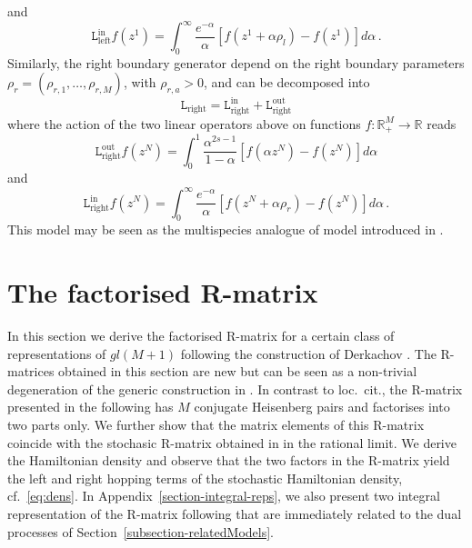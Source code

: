 \documentclass[11pt]{article}
\numberwithin{equation}{section}
\newcommand{\M}{M}
\newcommand{\N}{N}
\newcommand{\ecdL}{\mathtt{L}}
\newcommand{\heat}{z}
\begin{document}
and
\begin{equation}
	\ecdL_{\text{left}}^{\text{in}}f(\heat^{1})=\int_{0}^{\infty}\frac{e^{-\alpha}}{\alpha}\left[f(\heat^{1}+\alpha \rho_{l})- f(\heat^{1})\right]d \alpha\,.
\end{equation}
Similarly, the right boundary generator depend on the right boundary parameters $\rho_{r}=(\rho_{r,1},\ldots,\rho_{r,\M})$, with $\rho_{r,a}>0$, and can be decomposed into
\begin{equation}
	\ecdL_{\text{right}}=\ecdL_{\text{right}}^{\text{in}}+\ecdL_{\text{right}}^{\text{out}}
\end{equation}
where the action of the two linear operators above  on functions $f:\mathbb{R}_{+}^{\M}\to \mathbb{R}$ reads
\begin{equation}
	\ecdL_{\text{right}}^{\text{out}}f(\heat^{\N})=\int_0^1 \frac{\alpha^{2s-1}}{1-\alpha}\left[f(\alpha \heat^{\N})-f(\heat^{\N}) \right]d\alpha
\end{equation}
and
\begin{equation}
	\ecdL_{\text{right}}^{\text{in}}f(\heat^{\N})=\int_{0}^\infty\frac{e^{-\alpha}}{\alpha}\left[f(\heat^{\N}+\alpha \rho_{r})- f(\heat^{\N})\right]d \alpha\,.
\end{equation}
This model may be seen as the multispecies analogue of  model introduced in \cite{Frassek:2019vjt,Franceschini:2022vmr}.





\section{The factorised R-matrix}\label{sec:facR}
In this section we derive the factorised R-matrix for a certain class of representations of ${gl(\M+1)}$ following the construction of Derkachov \cite{Derkachov:2005hw}. The R-matrices obtained in this section are new but can be seen as a non-trivial degeneration of the generic construction in \cite{Derkachov:2008aq}. In contrast to loc.~cit., the R-matrix presented in the following has $M$ conjugate Heisenberg pairs and factorises into two parts only. We further show that the matrix elements of this R-matrix coincide with the stochasic R-matrix obtained in \cite{Kuniba:2016fpi,Bosnjak:2016oze} in the rational limit. We  derive the Hamiltonian density and observe that the two factors in the R-matrix yield the left and right hopping terms of the stochastic Hamiltonian density, cf.~\eqref{eq:dens}. In Appendix~\ref{section-integral-reps},  we also present two integral representation of the R-matrix following \cite{Derkachov:2005hw} that are immediately related to the dual processes of Section~\ref{subsection-relatedModels}.
\end{document}
